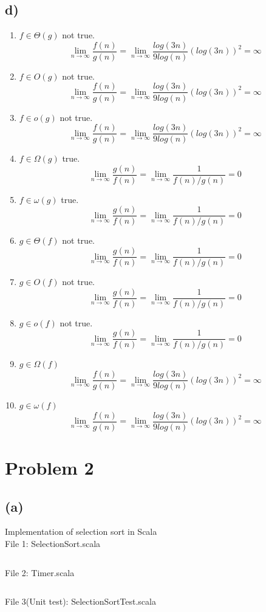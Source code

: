 \documentclass{article}
\begin{document}
\subsection*{d)}
\begin{enumerate}
    \item $f \in \Theta(g)$ not true.
        $$ \lim_{n \to \infty} \frac{f(n)}{g(n)} = \lim_{n \to \infty} \frac{log(3n)}{9 log(n)} (log(3n))^2 = \infty $$
    \item $f \in O(g)$ not true.
        $$ \lim_{n \to \infty} \frac{f(n)}{g(n)} = \lim_{n \to \infty} \frac{log(3n)}{9 log(n)} (log(3n))^2 = \infty $$
    \item $f \in o(g)$ not true.
        $$ \lim_{n \to \infty} \frac{f(n)}{g(n)} = \lim_{n \to \infty} \frac{log(3n)}{9 log(n)} (log(3n))^2 = \infty $$
    \item $f \in \Omega(g)$ true.
        $$ \lim_{n \to \infty} \frac{g(n)}{f(n)} = \lim_{n \to \infty} \frac{1}{f(n)/g(n)} = 0 $$
    \item $f \in \omega(g)$ true.
        $$ \lim_{n \to \infty} \frac{g(n)}{f(n)} = \lim_{n \to \infty} \frac{1}{f(n)/g(n)} = 0 $$
    \item $g \in \Theta(f)$ not true.
        $$ \lim_{n \to \infty} \frac{g(n)}{f(n)} = \lim_{n \to \infty} \frac{1}{f(n)/g(n)} = 0 $$
    \item $g \in O(f)$ not true.
        $$ \lim_{n \to \infty} \frac{g(n)}{f(n)} = \lim_{n \to \infty} \frac{1}{f(n)/g(n)} = 0 $$
    \item $g \in o(f)$ not true.
        $$ \lim_{n \to \infty} \frac{g(n)}{f(n)} = \lim_{n \to \infty} \frac{1}{f(n)/g(n)} = 0 $$
    \item $g \in \Omega(f)$
        $$ \lim_{n \to \infty} \frac{f(n)}{g(n)} = \lim_{n \to \infty} \frac{log(3n)}{9 log(n)} (log(3n))^2 = \infty $$
    \item $g \in \omega(f)$
        $$ \lim_{n \to \infty} \frac{f(n)}{g(n)} = \lim_{n \to \infty} \frac{log(3n)}{9 log(n)} (log(3n))^2 = \infty $$
\end{enumerate}

\section*{Problem 2}
\subsection*{(a)} Implementation of selection sort in Scala\\
File 1: SelectionSort.scala
\inputminted{Scala}{code/src/main/scala/SelectionSort.scala}
File 2: Timer.scala
\inputminted{Scala}{code/src/main/scala/Timer.scala}
File 3(Unit test): SelectionSortTest.scala
\inputminted{Scala}{code/src/test/scala/SelectionSortTest.scala}
\end{document}

